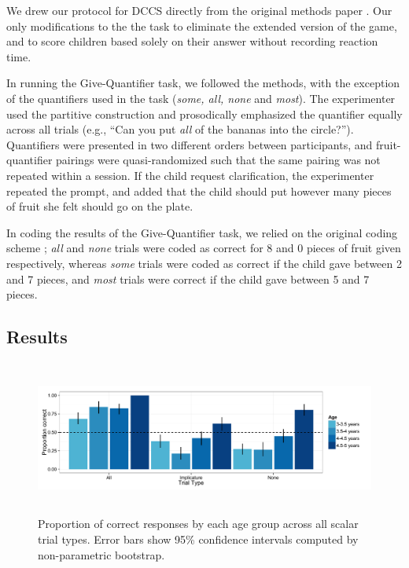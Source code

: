 \documentclass[man]{apa2}
\begin{document}
We drew our protocol for DCCS directly from the original methods paper \cite{zelazo2006}. Our only modifications to the the task to eliminate the extended version of the game, and to score children based solely on their answer without recording reaction time.  

In running the Give-Quantifier task, we followed the methods, with the exception of the quantifiers used in the task (\textit{some, all, none} and \textit{most}). The experimenter used the partitive construction and prosodically emphasized the quantifier equally across all trials (e.g., ``Can you put \textit{all} of the bananas into the circle?''). Quantifiers were presented in two different orders between participants, and fruit-quantifier pairings were quasi-randomized such that the same pairing was not repeated within a session. If the child request clarification, the experimenter repeated the prompt, and added that the child should put however many pieces of fruit she felt should go on the plate. 

In coding the results of the Give-Quantifier task, we relied on the original coding scheme \cite{barner2009}; \textit{all} and \textit{none} trials were coded as correct for 8 and 0 pieces of fruit given respectively, whereas \textit{some} trials were coded as correct if the child gave between 2 and 7 pieces, and \textit{most} trials were correct if the child gave between 5 and 7 pieces. 

\subsection{Results}

\begin{figure} 
 \begin{center} 
  \includegraphics[height=2in]{figures/exp3_performance.pdf} 
  \caption{\label{fig:exp3_perf} Proportion of correct responses by each age group across all scalar trial types.  Error bars show 95\% confidence intervals computed by non-parametric bootstrap.} 
 \end{center} 
\end{figure}
\end{document}
